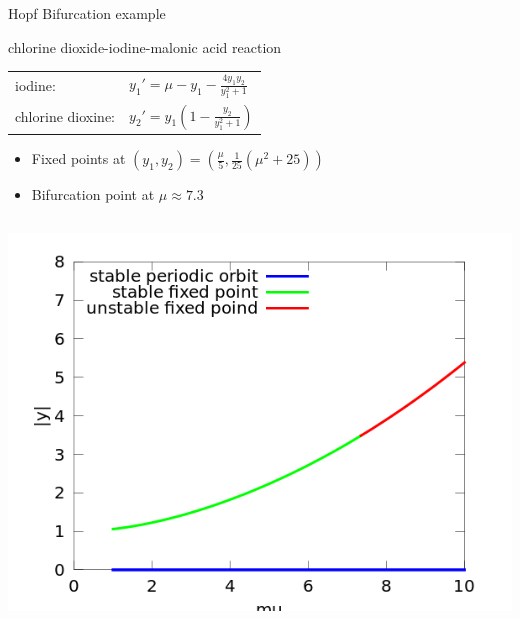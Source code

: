 \documentclass{beamer}
\begin{document}
\begin{frame}[t]{Hopf Bifurcation example}
            \begin{exampleblock}{chlorine dioxide-iodine-malonic acid reaction}
                \begin{tabular}{l l}
                iodine: & $y_{1}' = \mu - y_{1} - \frac{4 y_{1} y_{2} }{ y_{1}^{2} + 1}$  \\
                chlorine dioxine: & $ y_{2}' = y_{1} (1 - \frac{y_{2}}{y_{1}^{2} + 1})$
                \end{tabular}
            \end{exampleblock}
            \begin{itemize}
                \item Fixed points at $(y_1, y_2) = (\frac{\mu}{5}, \frac{1}{25}(\mu^2 + 25) )$
                \item Bifurcation point at $\mu \approx 7.3$
            \end{itemize}
     \begin{columns}
         \includegraphics[width=1\textwidth]{grafik/myrhshopf.png}

\end{columns}
\end{frame}
\end{document}

